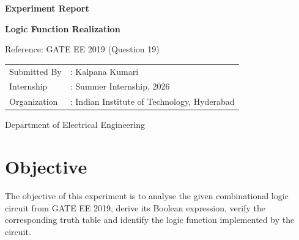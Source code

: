 \documentclass[12pt,a4paper]{article}
\begin{document}

\begin{titlepage}


\centering

\vspace{1.5cm}

{\Huge\textbf{Experiment Report}}

\vspace{0.6cm}

{\LARGE\textbf{Logic Function Realization}}

\vspace{0.3cm}

Reference: GATE EE 2019 (Question 19)

\vspace{2cm}

\renewcommand{\arraystretch}{2}

\begin{tabular}{ll}
Submitted By & : Kalpana Kumari \\
Internship & : Summer Internship, 2026 \\
Organization & : Indian Institute of Technology, Hyderabad \\
\end{tabular}

\vfill

\large
Department of Electrical Engineering

\end{titlepage}


\section{Objective}

The objective of this experiment is to analyse the given combinational logic circuit from GATE EE 2019, derive its Boolean expression, verify the corresponding truth table and identify the logic function implemented by the circuit.

\end{document}
